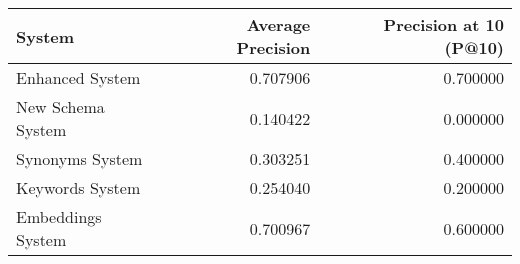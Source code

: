\begin{tabular}{lrr}
\toprule
System & Average Precision & Precision at 10 (P@10) \\
\midrule
Enhanced System & 0.707906 & 0.700000 \\
New Schema System & 0.140422 & 0.000000 \\
Synonyms System & 0.303251 & 0.400000 \\
Keywords System & 0.254040 & 0.200000 \\
Embeddings System & 0.700967 & 0.600000 \\
\bottomrule
\end{tabular}
